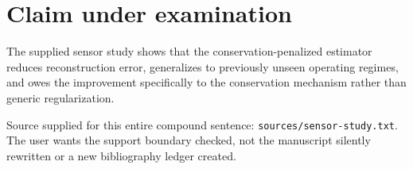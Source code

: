 \section{Claim under examination}
The supplied sensor study shows that the conservation-penalized estimator reduces reconstruction error, generalizes to previously unseen operating regimes, and owes the improvement specifically to the conservation mechanism rather than generic regularization.

Source supplied for this entire compound sentence: \texttt{sources/sensor-study.txt}.
The user wants the support boundary checked, not the manuscript silently rewritten or a new bibliography ledger created.
